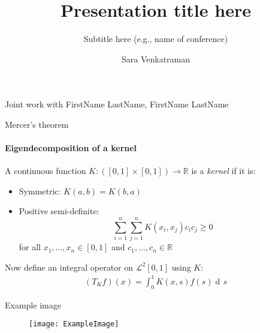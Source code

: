 \documentclass[dvipsnames, handout]{beamer}
\newcommand{\R}{\mathbb{R}}	%
\newcommand{\El}{\mathcal{L}}	%
\newcommand{\1}{\mathds{1}}	%
\DeclareMathOperator*{\dv}{d\!}		%
\begin{document}

    \title{\color{titleText}Presentation title here}
    \subtitle{\color{Blue}Subtitle here (e.g., name of conference)}
    \author{Sara Venkatraman\vspace{-.3cm}}
    \date{}

    \begin{frame}
        \titlepage
        \vspace{-1.2cm}
        \begin{center}
            {\begin{spacing}{1.2}\scriptsize
            Joint work with FirstName LastName, FirstName LastName
            \end{spacing}}
        \end{center}
    \end{frame}


    \begin{frame}{Mercer's theorem}
        \framesubtitle{Eigendecomposition of a kernel}
        A continuous function $K:([0,1]\times[0,1])\to\R$ is a \textit{kernel} if it is: \vspace{-0.4em}
        \pause
        \begin{itemize}
            \item Symmetric: $K(a,b)=K(b,a)$\pause
            \item Positive semi-definite: $$\sum_{i=1}^n\sum_{j=1}^nK(x_i,x_j)c_ic_j\geq 0$$ for all $ x_1,...,x_n\in[0,1]$ and $c_1,...,c_n\in\R$
        \end{itemize}
        \pause
        Now define an integral operator on $\El^2[0,1]$ using $K$:
        \begin{align*}
        (T_Kf)(x) = \int_0^1K(x,s)f(s)\dv s
        \end{align*}
    \end{frame}

    \begin{frame}{Example image}
        \begin{figure}[H]
            \centering\texttt{[image: ExampleImage]}
        \end{figure}
    \end{frame}

\end{document}
